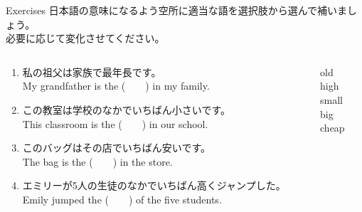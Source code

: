 \documentclass[aspectratio=169,xcolor={dvipsnames,table}]{beamer}
\begin{document}
\begin{frame}[plain]{Exercises}
日本語の意味になるよう空所に適当な語を選択肢から選んで補いましょう。\\必要に応じて変化させてください。

\begin{columns}[t]
 \begin{column}{.78\textwidth}
   \begin{enumerate}
  \item 私の祖父は家族で最年長です。\\
	My grandfather is the (~~~~) in my family. 
    \item この教室は学校のなかでいちばん小さいです。\\
	This classroom is the (~~~~) in our school. 
    \item このバッグはその店でいちばん安いです。\\
	The bag is the (~~~~) in the store.
    \item エミリーが5人の生徒のなかでいちばん高くジャンプした。\\
	Emily jumped the (~~~~) of the five students.

\end{enumerate}

 \end{column}
\begin{column}{.2\textwidth}
 \begin{tcolorbox}
  old\\
  high\\
  small\\
  big\\
  cheap
 \end{tcolorbox}
\end{column}
\end{columns}
\end{frame}
\end{document}
